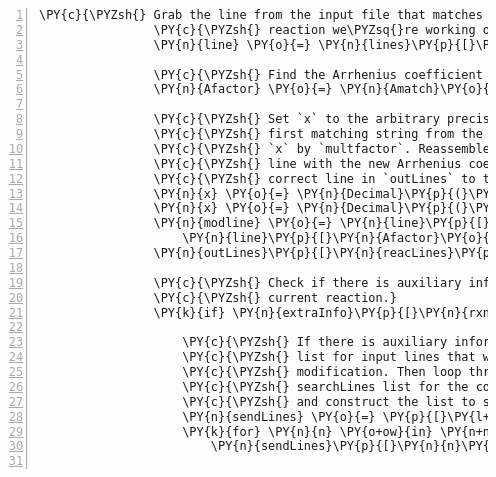 \begin{Verbatim}[commandchars=\\\{\},fontsize=\small,numbers=left,firstnumber=1,stepnumber=2,firstline=2]
                \PY{c}{\PYZsh{} Grab the line from the input file that matches the}
                \PY{c}{\PYZsh{} reaction we\PYZsq{}re working on.}
                \PY{n}{line} \PY{o}{=} \PY{n}{lines}\PY{p}{[}\PY{n}{reacLines}\PY{p}{[}\PY{n}{rxnNum}\PY{p}{]}\PY{p}{]}

                \PY{c}{\PYZsh{} Find the Arrhenius coefficient on this line.}
                \PY{n}{Afactor} \PY{o}{=} \PY{n}{Amatch}\PY{o}{.}\PY{n}{search}\PY{p}{(}\PY{n}{line}\PY{p}{)}

                \PY{c}{\PYZsh{} Set `x` to the arbitrary precision conversion of the}
                \PY{c}{\PYZsh{} first matching string from the Afactor match. Multiply}
                \PY{c}{\PYZsh{} `x` by `multfactor`. Reassemble the modified reaction}
                \PY{c}{\PYZsh{} line with the new Arrhenius coefficient, and set the}
                \PY{c}{\PYZsh{} correct line in `outLines` to the modified line.}
                \PY{n}{x} \PY{o}{=} \PY{n}{Decimal}\PY{p}{(}\PY{n}{Afactor}\PY{o}{.}\PY{n}{group}\PY{p}{(}\PY{l+m+mi}{1}\PY{p}{)}\PY{p}{)}
                \PY{n}{x} \PY{o}{=} \PY{n}{Decimal}\PY{p}{(}\PY{n}{multfactor}\PY{p}{)}\PY{o}{*}\PY{n}{x}
                \PY{n}{modline} \PY{o}{=} \PY{n}{line}\PY{p}{[}\PY{p}{:}\PY{n}{Afactor}\PY{o}{.}\PY{n}{start}\PY{p}{(}\PY{p}{)}\PY{p}{]} \PY{o}{+} \PY{n+nb}{str}\PY{p}{(}\PY{n}{x}\PY{p}{)} \PY{o}{+}
                    \PY{n}{line}\PY{p}{[}\PY{n}{Afactor}\PY{o}{.}\PY{n}{end}\PY{p}{(}\PY{p}{)}\PY{p}{:}\PY{p}{]}
                \PY{n}{outLines}\PY{p}{[}\PY{n}{reacLines}\PY{p}{[}\PY{n}{rxnNum}\PY{p}{]}\PY{p}{]} \PY{o}{=} \PY{n}{modline}

                \PY{c}{\PYZsh{} Check if there is auxiliary information for the}
                \PY{c}{\PYZsh{} current reaction.}
                \PY{k}{if} \PY{n}{extraInfo}\PY{p}{[}\PY{n}{rxnNum}\PY{p}{]} \PY{o}{\PYZgt{}} \PY{l+m+mi}{0}\PY{p}{:}

                    \PY{c}{\PYZsh{} If there is auxiliary information, initialize a}
                    \PY{c}{\PYZsh{} list for input lines that will be sent for}
                    \PY{c}{\PYZsh{} modification. Then loop through the lines in the}
                    \PY{c}{\PYZsh{} searchLines list for the correct reaction number}
                    \PY{c}{\PYZsh{} and construct the list to send for modification.}
                    \PY{n}{sendLines} \PY{o}{=} \PY{p}{[}\PY{l+m+mi}{0}\PY{p}{]}\PY{o}{*}\PY{n+nb}{len}\PY{p}{(}\PY{n}{searchLines}\PY{p}{[}\PY{n}{rxnNum}\PY{p}{]}\PY{p}{)}
                    \PY{k}{for} \PY{n}{n} \PY{o+ow}{in} \PY{n+nb}{range}\PY{p}{(}\PY{n+nb}{len}\PY{p}{(}\PY{n}{searchLines}\PY{p}{[}\PY{n}{rxnNum}\PY{p}{]}\PY{p}{)}\PY{p}{)}\PY{p}{:}
                        \PY{n}{sendLines}\PY{p}{[}\PY{n}{n}\PY{p}{]} \PY{o}{=} \PY{n}{lines}\PY{p}{[}\PY{n}{searchLines}\PY{p}{[}\PY{n}{rxnNum}\PY{p}{]}\PY{p}{[}\PY{n}{n}\PY{p}{]}\PY{p}{]}


\end{Verbatim}
